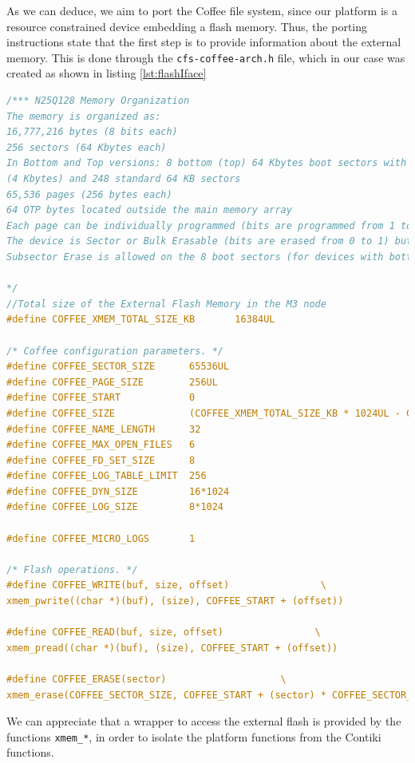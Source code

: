As we can deduce, we aim to port the Coffee file system, since our platform is a resource constrained device embedding a flash memory.
Thus, the porting instructions state that the first step is to provide information about the external memory.
This is done through the \texttt{cfs-coffee-arch.h} file, which in our case was created as shown in listing \ref{lst:flashIface}
\begin{lstlisting}[language=C, caption=Contiki header for external memory features, label=lst:flashIface]
/*** N25Q128 Memory Organization
The memory is organized as:
16,777,216 bytes (8 bits each)
256 sectors (64 Kbytes each)
In Bottom and Top versions: 8 bottom (top) 64 Kbytes boot sectors with 16 subsectors
(4 Kbytes) and 248 standard 64 KB sectors
65,536 pages (256 bytes each)
64 OTP bytes located outside the main memory array
Each page can be individually programmed (bits are programmed from 1 to 0).
The device is Sector or Bulk Erasable (bits are erased from 0 to 1) but not Page Erasable.
Subsector Erase is allowed on the 8 boot sectors (for devices with bottom or top architecture).

*/
//Total size of the External Flash Memory in the M3 node
#define COFFEE_XMEM_TOTAL_SIZE_KB       16384UL

/* Coffee configuration parameters. */
#define COFFEE_SECTOR_SIZE   	65536UL
#define COFFEE_PAGE_SIZE       	256UL
#define COFFEE_START            0
#define COFFEE_SIZE             (COFFEE_XMEM_TOTAL_SIZE_KB * 1024UL - COFFEE_START)
#define COFFEE_NAME_LENGTH      32
#define COFFEE_MAX_OPEN_FILES   6
#define COFFEE_FD_SET_SIZE      8
#define COFFEE_LOG_TABLE_LIMIT 	256
#define COFFEE_DYN_SIZE         16*1024
#define COFFEE_LOG_SIZE         8*1024

#define COFFEE_MICRO_LOGS       1

/* Flash operations. */
#define COFFEE_WRITE(buf, size, offset)                \
xmem_pwrite((char *)(buf), (size), COFFEE_START + (offset))

#define COFFEE_READ(buf, size, offset)                \
xmem_pread((char *)(buf), (size), COFFEE_START + (offset))

#define COFFEE_ERASE(sector)                    \
xmem_erase(COFFEE_SECTOR_SIZE, COFFEE_START + (sector) * COFFEE_SECTOR_SIZE)
\end{lstlisting}
We can appreciate that a wrapper to access the external flash is provided by the functions \texttt{xmem\_*}, in order to isolate the platform functions from the Contiki functions.


